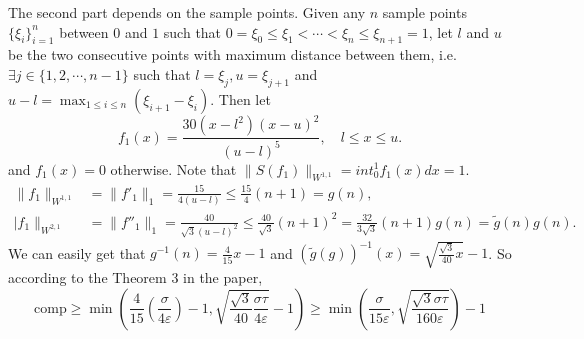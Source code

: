 The second part depends on the sample points. Given any $n$ sample points $\{\xi_i\}_{i=1}^{n}$ between $0$ and $1$ such that $0=\xi_0\leq \xi_1<\cdots<\xi_n\leq \xi_{n+1}=1$, let $l$ and $u$ be the two consecutive points with maximum distance between them, i.e. $\exists j\in \{1,2,\cdots,n-1\}$ such that $l=\xi_j, u=\xi_{j+1}$ and $u-l=\max_{1\leq i\leq n}(\xi_{i+1}-\xi_i)$. Then let
$$f_1(x)=\frac{30(x-l^2)(x-u)^2}{(u-l)^5}, \quad l\leq x\leq u.$$ and $f_1(x)=0$ otherwise. Note that $\|S(f_1)\|_{W^{1,1}}=int_{0}^{1}f_1(x)dx=1.$
\begin{align*}
  \|f_1\|_{W^{1,1}}&=\|f'_{1}\|_1=\frac{15}{4(u-l)}\leq \frac{15}{4}(n+1)=g(n),\\
  |f_1\|_{W^{2,1}}&=\|f''_{1}\|_1=\frac{40}{\sqrt{3}(u-l)^2}\leq \frac{40}{\sqrt{3}}(n+1)^2=\frac{32}{3\sqrt{3}}(n+1)g(n)=\tilde{g}(n)g(n).
\end{align*}
We can easily get that $g^{-1}(n)=\frac{4}{15}x-1$ and $(\tilde{g}(g))^{-1}(x)=\sqrt{\frac{\sqrt{3}}{40}x}-1$. So according to the Theorem 3 in the paper, $$\text{comp}\geq \min\left(\frac{4}{15}(\frac{\sigma}{4\varepsilon})-1,\sqrt{\frac{\sqrt{3}}{40}\frac{\sigma\tau}{4\varepsilon}}-1\right)\geq\min\left(\frac{\sigma}{15\varepsilon},\sqrt{\frac{\sqrt{3}\sigma\tau}{160\varepsilon}}\right)-1$$